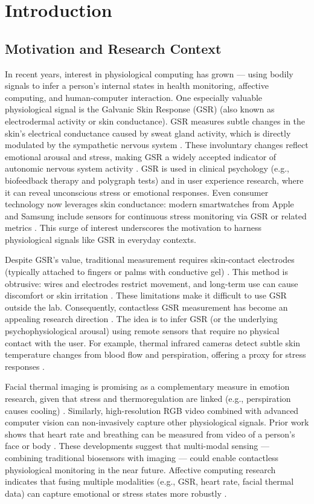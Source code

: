 \chapter{Introduction}

\section{Motivation and Research Context}
In recent years, interest in physiological computing has grown --- using bodily signals to infer a person's internal states in health monitoring, affective computing, and human-computer interaction. One especially valuable physiological signal is the Galvanic Skin Response (GSR) (also known as electrodermal activity or skin conductance). GSR measures subtle changes in the skin's electrical conductance caused by sweat gland activity, which is directly modulated by the sympathetic nervous system \citep{ref1}. These involuntary changes reflect emotional arousal and stress, making GSR a widely accepted indicator of autonomic nervous system activity \citep{ref1}. GSR is used in clinical psychology (e.g., biofeedback therapy and polygraph tests) and in user experience research, where it can reveal unconscious stress or emotional responses. Even consumer technology now leverages skin conductance: modern smartwatches from Apple and Samsung include sensors for continuous stress monitoring via GSR or related metrics \citep{ref2}. This surge of interest underscores the motivation to harness physiological signals like GSR in everyday contexts.

Despite GSR's value, traditional measurement requires skin-contact electrodes (typically attached to fingers or palms with conductive gel) \citep{ref3}. This method is obtrusive: wires and electrodes restrict movement, and long-term use can cause discomfort or skin irritation \citep{ref3}. These limitations make it difficult to use GSR outside the lab. Consequently, contactless GSR measurement has become an appealing research direction \citep{ref4}. The idea is to infer GSR (or the underlying psychophysiological arousal) using remote sensors that require no physical contact with the user. For example, thermal infrared cameras detect subtle skin temperature changes from blood flow and perspiration, offering a proxy for stress responses \citep{ref5}.

Facial thermal imaging is promising as a complementary measure in emotion research, given that stress and thermoregulation are linked (e.g., perspiration causes cooling) \citep{ref5}. Similarly, high-resolution RGB video combined with advanced computer vision can non-invasively capture other physiological signals. Prior work shows that heart rate and breathing can be measured from video of a person's face or body \citep{ref6}. These developments suggest that multi-modal sensing --- combining traditional biosensors with imaging --- could enable contactless physiological monitoring in the near future. Affective computing research indicates that fusing multiple modalities (e.g., GSR, heart rate, facial thermal data) can capture emotional or stress states more robustly \citep{ref1}.


